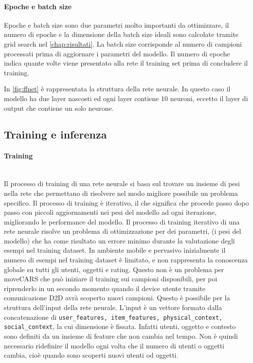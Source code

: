 \documentclass[12pt,italian]{report}
\newcommand{\myparagraph}[1]{\paragraph{#1}\mbox{}\\} %
\begin{document}
\paragraph{Epoche e batch size}
Epoche e batch size sono due parametri molto importanti da ottimizzare, il numero di epoche e la dimensione della batch size ideali sono calcolate tramite grid search nel \autoref{chap:risultati}. La batch size corrisponde al numero di campioni processati prima di aggiornare i parametri del modello. Il numero di epoche indica quante volte viene presentato alla rete il training set prima di concludere il training.

\bigskip
In \autoref{fig:ffnet} è rappresentata la struttura della rete neurale. In questo caso il modello ha due layer nascosti ed ogni layer contiene 10 neuroni, eccetto il layer di output che contiene un solo neurone.

\subsection{Training e inferenza} \label{subsec: training}
\myparagraph{Training}
Il processo di training di una rete neurale si basa sul trovare un insieme di pesi nella rete che permettano di risolvere nel modo migliore possibile un problema specifico. Il processo di training è iterativo, il che significa che procede passo dopo passo con piccoli aggiornamenti nei pesi del modello ad ogni iterazione, migliorando le performance del modello. Il processo di training iterativo di una rete neurale risolve un problema di ottimizzazione per dei parametri, (i pesi del modello) che ha come risultato un errore minimo durante la valutazione degli esempi nel training dataset. In ambiente mobile e pervasivo inizialmente il numero di esempi nel training dataset è limitato, e non rappresenta la conoscenza globale su tutti gli utenti, oggetti e rating. Questo non è un problema per moveCARS che può iniziare il training sui campioni disponibili, per poi riprenderlo in un secondo momento quando il device utente tramite comunicazione D2D avrà scoperto nuovi campioni. Questo è possibile per la struttura dell'input della rete neurale. L'input è un vettore formato dalla concatenazione di \texttt{user\_features, item\_features, physical\_context, social\_context}, la cui dimensione è fissata. Infatti utenti, oggetto e contesto sono definiti da un insieme di feature che non cambia nel tempo. Non è quindi necessario ridefinire il modello ogni volta che il numero di utenti o oggetti cambia, cioè quando sono scoperti nuovi utenti od oggetti.
\end{document}
